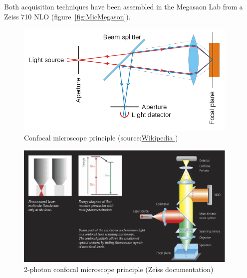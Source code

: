 Both acquisition techniques have been assembled in the Megasaon Lab from a
Zeiss 710 NLO (figure~\ref{fig:MicMegason}).


\begin{figure}[htb]
\begin{center}
\leavevmode
 \includegraphics[width=0.95\textwidth]{pictures/ConfocalPrinciple}
\end{center}
\caption{Confocal microscope principle
(source:\href{http://en.wikipedia.org/wiki/File:Confocalprinciple.svg}{Wikipedia
})}
\label{fig:ConfocalPrinciple}
\end{figure}

\begin{figure}[htb]
\begin{center}
\leavevmode
 \includegraphics[width=0.95\textwidth]{pictures/ConfocalZeissPrinciple}
\end{center}
\caption{2-photon confocal microscope principle (Zeiss documentation)}
\label{fig:Confocal2photonsPrinciple}
\end{figure}


